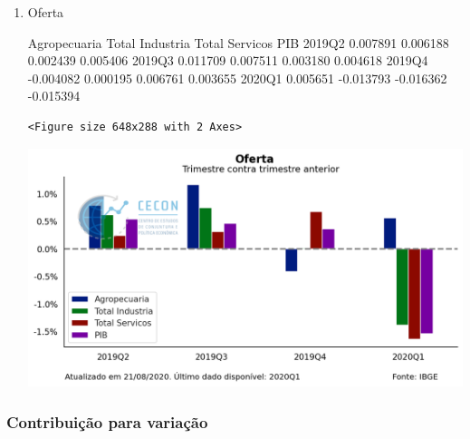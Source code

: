 \documentclass[11pt]{article}
\begin{document}
\begin{enumerate}
\item Oferta
\label{sec:org1bb8ecf}


        Agropecuaria  Total Industria  Total Servicos       PIB
2019Q2      0.007891         0.006188        0.002439  0.005406
2019Q3      0.011709         0.007511        0.003180  0.004618
2019Q4     -0.004082         0.000195        0.006761  0.003655
2020Q1      0.005651        -0.013793       -0.016362 -0.015394

\begin{verbatim}
<Figure size 648x288 with 2 Axes>
\end{verbatim}


\begin{center}
\includegraphics[width=.9\linewidth]{obipy-resources/62e383af79e91b63c7fc98dd7fb55b3c3ececcb9/57372e79c1f7d0213e749718ec1996ac93157539.png}
\end{center}
\end{enumerate}


\subsubsection{Contribuição para variação}
\label{sec:orgca25669}
\end{document}
